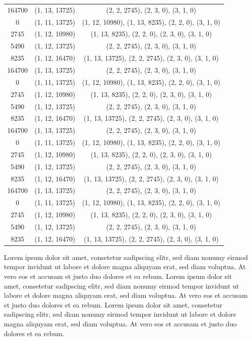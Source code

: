 \begin{small}
\begin{longtable}{ccc}
		164700 & (1, 13, 13725) & (2, 2, 2745), (2, 3, 0), (3, 1, 0) \\
		0      & (1, 11, 13725) & (1, 12, 10980), (1, 13, 8235), (2, 2, 0), (3, 1, 0) \\
		2745   & (1, 12, 10980) & (1, 13, 8235), (2, 2, 0), (2, 3, 0), (3, 1, 0) \\
		5490   & (1, 12, 13725) & (2, 2, 2745), (2, 3, 0), (3, 1, 0) \\
		8235   & (1, 12, 16470) & (1, 13, 13725), (2, 2, 2745), (2, 3, 0), (3, 1, 0) \\
		164700 & (1, 13, 13725) & (2, 2, 2745), (2, 3, 0), (3, 1, 0) \\
		0      & (1, 11, 13725) & (1, 12, 10980), (1, 13, 8235), (2, 2, 0), (3, 1, 0) \\
		2745   & (1, 12, 10980) & (1, 13, 8235), (2, 2, 0), (2, 3, 0), (3, 1, 0) \\
		5490   & (1, 12, 13725) & (2, 2, 2745), (2, 3, 0), (3, 1, 0) \\
		8235   & (1, 12, 16470) & (1, 13, 13725), (2, 2, 2745), (2, 3, 0), (3, 1, 0) \\
		164700 & (1, 13, 13725) & (2, 2, 2745), (2, 3, 0), (3, 1, 0) \\
		0      & (1, 11, 13725) & (1, 12, 10980), (1, 13, 8235), (2, 2, 0), (3, 1, 0) \\
		2745   & (1, 12, 10980) & (1, 13, 8235), (2, 2, 0), (2, 3, 0), (3, 1, 0) \\
		5490   & (1, 12, 13725) & (2, 2, 2745), (2, 3, 0), (3, 1, 0) \\
		8235   & (1, 12, 16470) & (1, 13, 13725), (2, 2, 2745), (2, 3, 0), (3, 1, 0) \\
		164700 & (1, 13, 13725) & (2, 2, 2745), (2, 3, 0), (3, 1, 0) \\
		0      & (1, 11, 13725) & (1, 12, 10980), (1, 13, 8235), (2, 2, 0), (3, 1, 0) \\
		2745   & (1, 12, 10980) & (1, 13, 8235), (2, 2, 0), (2, 3, 0), (3, 1, 0) \\
		5490   & (1, 12, 13725) & (2, 2, 2745), (2, 3, 0), (3, 1, 0) \\
		8235   & (1, 12, 16470) & (1, 13, 13725), (2, 2, 2745), (2, 3, 0), (3, 1, 0) \\
\end{longtable}
\end{small}
\vspace{-6pt} %

Lorem ipsum dolor sit amet, consetetur sadipscing elitr, sed diam nonumy eirmod tempor invidunt ut labore et dolore magna aliquyam erat, sed diam voluptua. At vero eos et accusam et justo duo dolores et ea rebum. Lorem ipsum dolor sit amet, consetetur sadipscing elitr, sed diam nonumy eirmod tempor invidunt ut labore et dolore magna aliquyam erat, sed diam voluptua. At vero eos et accusam et justo duo dolores et ea rebum. Lorem ipsum dolor sit amet, consetetur sadipscing elitr, sed diam nonumy eirmod tempor invidunt ut labore et dolore magna aliquyam erat, sed diam voluptua. At vero eos et accusam et justo duo dolores et ea rebum. 